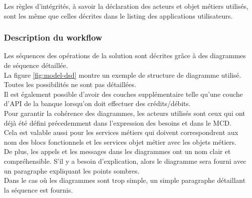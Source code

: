 Les règles d'intégrités, à savoir la déclaration des acteurs et objet métiers
utilisés, sont les même que celles décrites dans le listing des applications
utilisateurs. \\

\subsubsection{Description du workflow}
Les séquences des opérations de la solution sont décrites grâce à des
diagrammes de séquence détaillée. \\

La figure \ref{fig:model-dsd} montre un exemple de structure de diagramme
utilisé. Toutes les possibilités ne sont pas détaillées. \\

Il est également possible d'avoir des couches supplémentaire telle qu'une couche
d'API de la banque lorsqu'on doit effectuer des crédits/débits. \\

Pour garantir la cohérence des diagrammes, les acteurs utilisés sont ceux qui
ont déjà été défini précedemment dans l'expression des besoins et dans le MCD. \\

Cela est valable aussi pour les services métiers qui doivent correspondrent aux
nom des blocs fonctionnels et les services objet métier avec les objets
métiers. \\

De plus, les appels et les messages dans les diagrammes ont un nom clair et
compréhensible. S'il y a besoin d'explication, alors le diagramme sera fourni
avec un paragraphe expliquant les points sombres. \\

Dans le cas où les diagrammes sont trop simple, un simple paragraphe détaillant
la séquence est fournis. \\

